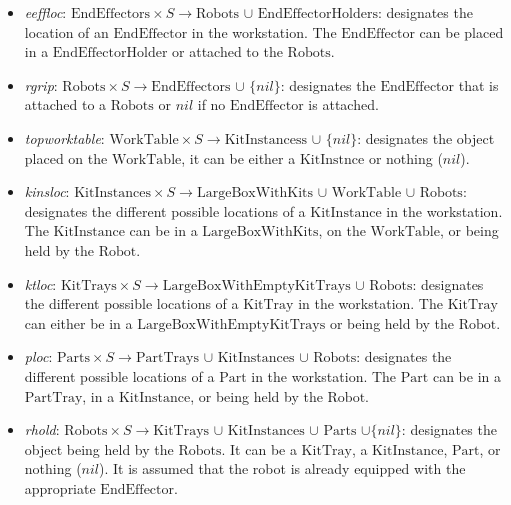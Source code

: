 \begin{itemize}
\item \emph{eeffloc}: $\mathrm{EndEffectors}\times S\rightarrow\mathrm{Robots}$ $\cup$ $\mathrm{EndEffectorHolders}$: designates the location of an $\mathrm{EndEffector}$ in the workstation. The $\mathrm{EndEffector}$ can be placed in a $\mathrm{EndEffectorHolder}$ or attached to the $\mathrm{Robots}$.

\item \emph{rgrip}: $\mathrm{Robots}\times S\rightarrow\mathrm{EndEffectors}$ $\cup$ $\lbrace nil\rbrace$: designates the $\mathrm{EndEffector}$ that is attached to a $\mathrm{Robots}$ or $nil$ if no $\mathrm{EndEffector}$ is attached.

\item \emph{topworktable}: $\mathrm{WorkTable}\times S\rightarrow\mathrm{KitInstancess}$ $\cup$ $\lbrace nil\rbrace$: designates the object placed on the $\mathrm{WorkTable}$, it can be either a $\mathrm{KitInstnce}$ or nothing ($nil$).

\item \emph{kinsloc}: $\mathrm{KitInstances}\times S\rightarrow\mathrm{LargeBoxWithKits}$ $\cup$ $\mathrm{WorkTable}$ $\cup$ $\mathrm{Robots}$: designates the different possible locations of a $\mathrm{KitInstance}$ in the workstation. The $\mathrm{KitInstance}$ can be in a $\mathrm{LargeBoxWithKits}$, on the $\mathrm{WorkTable}$, or being held by the $\mathrm{Robot}$.

\item \emph{ktloc}: $\mathrm{KitTrays}\times S\rightarrow\mathrm{LargeBoxWithEmptyKitTrays}$ $\cup$ $\mathrm{Robots}$: designates the different possible locations of a $\mathrm{KitTray}$ in the workstation. The $\mathrm{KitTray}$ can either be in a $\mathrm{LargeBoxWithEmptyKitTrays}$ or being held by the $\mathrm{Robot}$.

\item \emph{ploc}: $\mathrm{Parts}\times S\rightarrow\mathrm{PartTrays}$ $\cup$ $\mathrm{KitInstances}$ $\cup$ $\mathrm{Robots}$: designates the different possible locations of a $\mathrm{Part}$ in the workstation. The $\mathrm{Part}$ can be in a $\mathrm{PartTray}$, in a $\mathrm{KitInstance}$, or being held by the $\mathrm{Robot}$.

\item \emph{rhold}: $\mathrm{Robots}\times S\rightarrow\mathrm{KitTrays}$ $\cup$ $\mathrm{KitInstances}$ $\cup$ $\mathrm{Parts}$ $\cup \lbrace nil\rbrace$: designates the object being held by the $\mathrm{Robots}$. It can be a $\mathrm{KitTray}$, a $\mathrm{KitInstance}$, $\mathrm{Part}$, or nothing ($nil$). It is assumed that the robot is already equipped with the appropriate $\mathrm{EndEffector}$.


\end{itemize}
